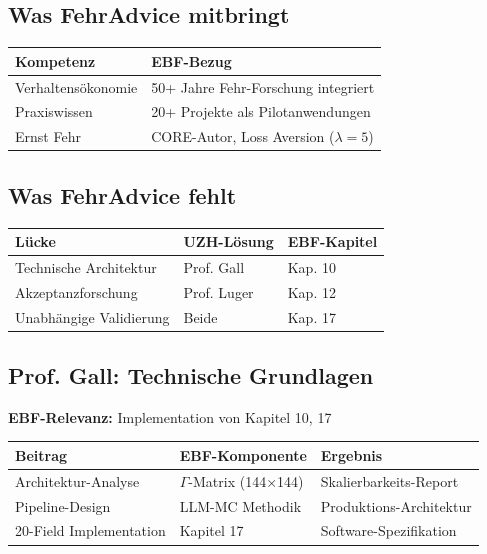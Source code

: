 \documentclass[11pt,a4paper]{article}
\begin{document}
\subsection{Was FehrAdvice mitbringt}

\begin{center}
\begin{tabular}{ll}
\toprule
\textbf{Kompetenz} & \textbf{EBF-Bezug} \\
\midrule
Verhaltensökonomie & 50+ Jahre Fehr-Forschung integriert \\
Praxiswissen & 20+ Projekte als Pilotanwendungen \\
Ernst Fehr & CORE-Autor, Loss Aversion ($\lambda=5$) \\
\bottomrule
\end{tabular}
\end{center}

\subsection{Was FehrAdvice fehlt}

\begin{center}
\begin{tabular}{lll}
\toprule
\textbf{Lücke} & \textbf{UZH-Lösung} & \textbf{EBF-Kapitel} \\
\midrule
Technische Architektur & Prof. Gall & Kap. 10 \\
Akzeptanzforschung & Prof. Luger & Kap. 12 \\
Unabhängige Validierung & Beide & Kap. 17 \\
\bottomrule
\end{tabular}
\end{center}

\subsection{Prof. Gall: Technische Grundlagen}

\begin{ebfbox}
\textbf{EBF-Relevanz:} Implementation von Kapitel 10, 17
\end{ebfbox}

\begin{center}
\begin{tabular}{lll}
\toprule
\textbf{Beitrag} & \textbf{EBF-Komponente} & \textbf{Ergebnis} \\
\midrule
Architektur-Analyse & $\Gamma$-Matrix (144×144) & Skalierbarkeits-Report \\
Pipeline-Design & LLM-MC Methodik & Produktions-Architektur \\
20-Field Implementation & Kapitel 17 & Software-Spezifikation \\
\bottomrule
\end{tabular}
\end{center}
\end{document}
